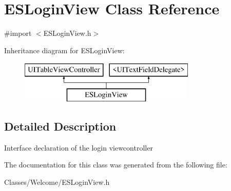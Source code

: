 \hypertarget{interface_e_s_login_view}{}\section{E\+S\+Login\+View Class Reference}
\label{interface_e_s_login_view}


{\ttfamily \#import $<$E\+S\+Login\+View.\+h$>$}

Inheritance diagram for E\+S\+Login\+View\+:\begin{figure}[H]
\begin{center}
\leavevmode
\includegraphics[height=2.000000cm]{interface_e_s_login_view}
\end{center}
\end{figure}


\subsection{Detailed Description}
Interface declaration of the login viewcontroller 

The documentation for this class was generated from the following file\+:\begin{DoxyCompactItemize}
\item 
Classes/\+Welcome/E\+S\+Login\+View.\+h\end{DoxyCompactItemize}
